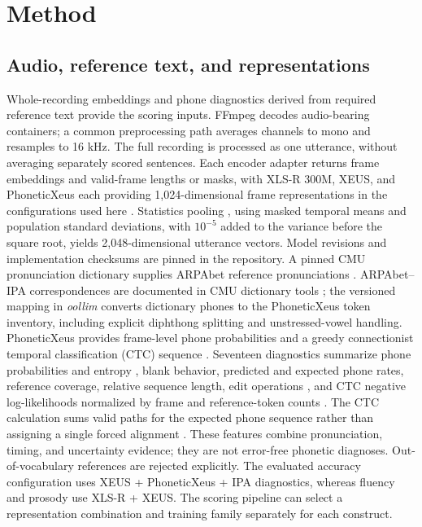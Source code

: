 \documentclass[cameraready]{Interspeech}
\begin{document}
\section{Method}
\subsection{Audio, reference text, and representations}
Whole-recording embeddings and phone diagnostics derived from required reference text provide the scoring inputs. FFmpeg \cite{ffmpeg} decodes audio-bearing containers; a common preprocessing path averages channels to mono and resamples to 16 kHz. The full recording is processed as one utterance, without averaging separately scored sentences. Each encoder adapter returns frame embeddings and valid-frame lengths or masks, with XLS-R 300M, XEUS, and PhoneticXeus each providing 1,024-dimensional frame representations in the configurations used here \cite{xlsr,xeus,phonetic}. Statistics pooling \cite{pooling}, using masked temporal means and population standard deviations, with $10^{-5}$ added to the variance before the square root, yields 2,048-dimensional utterance vectors. Model revisions and implementation checksums are pinned in the repository. A pinned CMU pronunciation dictionary supplies ARPAbet reference pronunciations \cite{cmudict}. ARPAbet--IPA correspondences are documented in CMU dictionary tools \cite{cmutools}; the versioned mapping in \textit{oollim} converts dictionary phones to the PhoneticXeus token inventory, including explicit diphthong splitting and unstressed-vowel handling. PhoneticXeus provides frame-level phone probabilities and a greedy connectionist temporal classification (CTC) sequence \cite{phonetic,ctc}. Seventeen diagnostics summarize phone probabilities and entropy \cite{shannon}, blank behavior, predicted and expected phone rates, reference coverage, relative sequence length, edit operations \cite{editdistance}, and CTC negative log-likelihoods normalized by frame and reference-token counts \cite{ctc}. The CTC calculation sums valid paths for the expected phone sequence rather than assigning a single forced alignment \cite{ctc}. These features combine pronunciation, timing, and uncertainty evidence; they are not error-free phonetic diagnoses. Out-of-vocabulary references are rejected explicitly. The evaluated accuracy configuration uses XEUS + PhoneticXeus + IPA diagnostics, whereas fluency and prosody use XLS-R + XEUS. The scoring pipeline can select a representation combination and training family separately for each construct.
\end{document}

